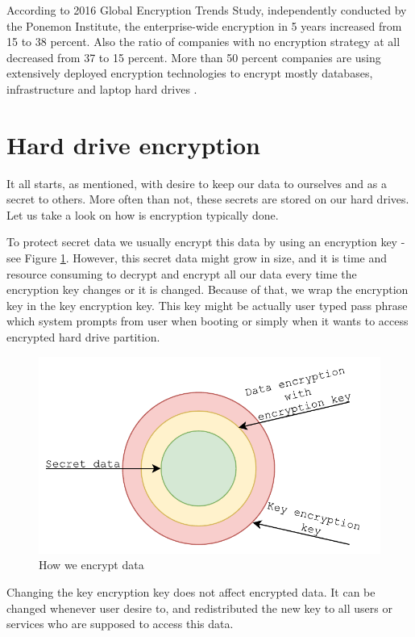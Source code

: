 According to 2016 Global Encryption Trends Study, independently conducted by the Ponemon Institute, the enterprise-wide encryption in 5 years increased from 15 to 38 percent.
Also the ratio of companies with no encryption strategy at all decreased from 37 to 15 percent. 
More than 50 percent companies are using extensively deployed encryption technologies to encrypt mostly databases, infrastructure and laptop hard drives \cite{Thales}. 

\section{Hard drive encryption}

It all starts, as mentioned, with desire to keep our data to ourselves and as a secret to others.
More often than not, these secrets are stored on our hard drives.
Let us take a look on how is encryption typically done.

To protect secret data we usually encrypt this data by using an encryption key - see Figure \ref{fig:encdata}.
However, this secret data might grow in size, and it is time and resource consuming to decrypt and encrypt all our data every time the encryption key changes or it is changed.
Because of that, we wrap the encryption key in the key encryption key. 
This key might be actually user typed pass phrase which system prompts from user when booting or simply when it wants to access encrypted hard drive partition.


\begin{figure}[h]
    \centering
    \includegraphics[scale=0.7]{figures/HowWeEncryptData.pdf} 
    \caption{How we encrypt data}
    \label{fig:encdata}
\end{figure}

Changing the key encryption key does not affect encrypted data.
It can be changed whenever user desire to, and redistributed the new key to all users or services who are supposed to access this data.

